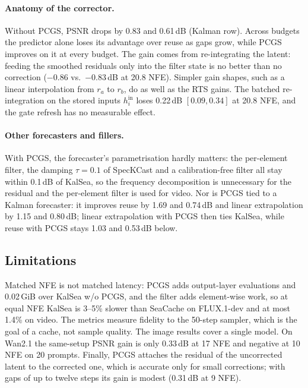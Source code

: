 \paragraph{Anatomy of the corrector.} Without PCGS, PSNR drops by 0.83 and 0.61\,dB (Kalman row). Across budgets the predictor alone loses its advantage over reuse as gaps grow, while PCGS improves on it at every budget. The gain comes from re-integrating the latent: feeding the smoothed residuals only into the filter state is no better than no correction ($-0.86$ vs.\ $-0.83$\,dB at 20.8 NFE). Simpler gain shapes, such as a linear interpolation from $r_a$ to $r_b$, do as well as the RTS gains. The batched re-integration on the stored inputs $h^{\mathrm{in}}_i$ loses 0.22\,dB $[0.09,0.34]$ at 20.8 NFE, and the gate refresh has no measurable effect.

\paragraph{Other forecasters and fillers.} With PCGS, the forecaster's parametrisation hardly matters: the per-element filter, the damping $\tau=0.1$ of SpecKCast and a calibration-free filter all stay within 0.1\,dB of KalSea, so the frequency decomposition is unnecessary for the residual and the per-element filter is used for video. Nor is PCGS tied to a Kalman forecaster: it improves reuse by 1.69 and 0.74\,dB and linear extrapolation by 1.15 and 0.80\,dB; linear extrapolation with PCGS then ties KalSea, while reuse with PCGS stays 1.03 and 0.53\,dB below.

\subsection{Limitations}
Matched NFE is not matched latency: PCGS adds output-layer evaluations and 0.02\,GiB over KalSea w/o PCGS, and the filter adds element-wise work, so at equal NFE KalSea is 3--5\% slower than SeaCache on FLUX.1-dev and at most 1.4\% on video. The metrics measure fidelity to the 50-step sampler, which is the goal of a cache, not sample quality. The image results cover a single model. On Wan2.1 the same-setup PSNR gain is only 0.33\,dB at 17 NFE and negative at 10 NFE on 20 prompts. Finally, PCGS attaches the residual of the uncorrected latent to the corrected one, which is accurate only for small corrections; with gaps of up to twelve steps its gain is modest (0.31\,dB at 9 NFE).

